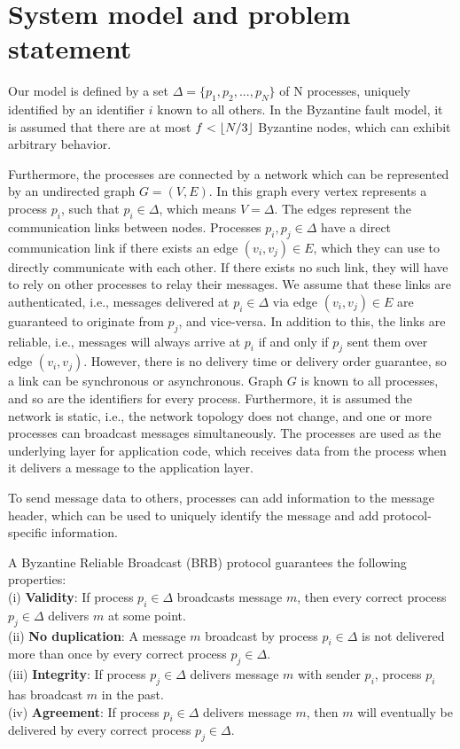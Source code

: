 \section{System model and problem statement}
\label{system-model}
Our model is defined by a set $\Delta=\{p_1, p_2,...,p_N\}$ of N processes, uniquely identified by an identifier $i$ known to all others. In the Byzantine fault model, it is assumed that there are at most $f < \lfloor N/3\rfloor$ Byzantine nodes, which can exhibit arbitrary behavior. 

Furthermore, the processes are connected by a network which can be represented by an undirected graph $G=(V, E)$. In this graph every vertex represents a process $p_i$, such that $p_i \in \Delta$, which means $V=\Delta$. The edges represent the communication links between nodes.
Processes $p_i, p_j \in \Delta$ have a direct communication link if there exists an edge $(v_i, v_j) \in E$, which they can use to directly communicate with each other. If there exists no such link, they will have to rely on other processes to relay their messages. We assume that these links are authenticated, i.e., messages delivered at $p_i \in \Delta$ via edge $(v_i, v_j) \in E$ are guaranteed to originate from $p_j$, and vice-versa. In addition to this, the links are reliable, i.e., messages will always arrive at $p_i$ if and only if $p_j$ sent them over edge $(v_i, v_j)$. However, there is no delivery time or delivery order guarantee, so a link can be synchronous or asynchronous. Graph $G$ is known to all processes, and so are the identifiers for every process. Furthermore, it is assumed the network is static, i.e., the network topology does not change, and one or more processes can broadcast messages simultaneously. The processes are used as the underlying layer for application code, which receives data from the process when it delivers a message to the application layer.

To send message data to others, processes can add information to the message header, which can be used to uniquely identify the message and add protocol-specific information.

A Byzantine Reliable Broadcast (BRB) protocol guarantees the following properties:\\
(i) \textbf{Validity}: If process $p_i \in \Delta$ broadcasts message $m$, then every correct process $p_j \in \Delta$ delivers $m$ at some point.\\
(ii) \textbf{No duplication}: A message $m$ broadcast by process $p_i \in \Delta$ is not delivered more than once by every correct process $p_j \in \Delta$.\\
(iii) \textbf{Integrity}: If process $p_j \in \Delta$ delivers message $m$ with sender $p_i$, process $p_i$ has broadcast $m$ in the past.\\
(iv) \textbf{Agreement}: If process $p_i \in \Delta$ delivers message $m$, then $m$ will eventually be delivered by every correct process $p_j \in \Delta$.


